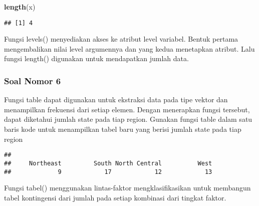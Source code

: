 \documentclass[
]{article}
\newenvironment{Shaded}{\begin{snugshade}}{\end{snugshade}}
\newcommand{\KeywordTok}[1]{\textcolor[rgb]{0.13,0.29,0.53}{\textbf{#1}}}
\newcommand{\NormalTok}[1]{#1}
\newcommand{\OperatorTok}[1]{\textcolor[rgb]{0.81,0.36,0.00}{\textbf{#1}}}
\begin{document}
\begin{Shaded}
\begin{Highlighting}[]
\KeywordTok{length}\NormalTok{(x)}
\end{Highlighting}
\end{Shaded}

\begin{verbatim}
## [1] 4
\end{verbatim}

Fungsi levels() menyediakan akses ke atribut level variabel. Bentuk
pertama mengembalikan nilai level argumennya dan yang kedua menetapkan
atribut. Lalu fungsi length() digunakan untuk mendapatkan jumlah data.

\hypertarget{soal-nomor-6}{%
\subsubsection{Soal Nomor 6}\label{soal-nomor-6}}

Fungsi table dapat digunakan untuk ekstraksi data pada tipe vektor dan
menampilkan frekuensi dari setiap elemen. Dengan menerapkan fungsi
tersebut, dapat diketahui jumlah state pada tiap region. Gunakan fungsi
table dalam satu baris kode untuk menampilkan tabel baru yang berisi
jumlah state pada tiap region

\begin{Shaded}
\end{Shaded}

\begin{verbatim}
## 
##     Northeast         South North Central          West 
##             9            17            12            13
\end{verbatim}

Fungsi tabel() menggunakan lintas-faktor mengklasifikasikan untuk
membangun tabel kontingensi dari jumlah pada setiap kombinasi dari
tingkat faktor.
\end{document}
